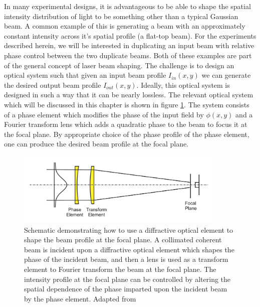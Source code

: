 In many experimental designs, it is advantageous to be able to shape the spatial intensity distribution of light to be something other than a typical Gaussian beam.  A common example of this is generating a beam with an approximately constant intensity across it's spatial profile (a flat-top beam).  For the experiments described herein, we will be interested in duplicating an input beam with relative phase control between the two duplicate beams.  Both of these examples are part of the general concept of laser beam shaping.  The challenge is to design an optical system such that given an input beam profile $I_{in}(x,y)$ we can generate the desired output beam profile $I_{out}(x,y)$. Ideally, this optical system is designed in such a way that it can be nearly lossless.  The relevant optical system which will be discussed in this chapter is shown in figure \ref{fig:beam_shaping_scheme}.  The system consists of a phase element which modifies the phase of the input field by $\phi(x,y)$ and a Fourier transform lens which adds a quadratic phase to the beam to focus it at the focal plane.  By appropriate choice of the phase profile of the phase element, one can produce the desired beam profile at the focal plane.


\begin{figure}
	\centering
	\includegraphics[width=0.9\textwidth]{figures/Two_source/romero_beam_shaping_schematic.png}
	\caption[Schematic of beam shaping using a phase element]{Schematic demonstrating how to use a diffractive optical element to shape the beam profile at the focal plane. A collimated coherent beam is incident upon a diffractive optical element which shapes the phase of the incident beam, and then a lens is used as a transform element to Fourier transform the beam at the focal plane.  The intensity profile at the focal plane can be controlled by altering the spatial dependence of the phase imparted upon the incident beam by the phase element. Adapted from \cite{romeroMathematicalAspectsLaser2010}}
	\label{fig:beam_shaping_scheme}
\end{figure}


